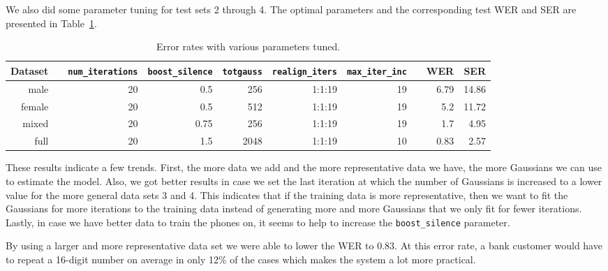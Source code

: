 \documentclass[twocolumn, 11pt]{article}
\begin{document}
We also did some parameter tuning for test sets 2 through 4. The optimal
parameters and the corresponding test WER and SER are presented in
Table~\ref{tab:wer-param}.

\begin{table}\centering
  \begin{tabular}{@{}rcrrrrrcrr@{}}\toprule%
    Dataset & \phantom{a} & \texttt{num\_iterations} & \texttt{boost\_silence}
    & \texttt{totgauss} & \texttt{realign\_iters} & \texttt{max\_iter\_inc}
    & \phantom{a} & WER & SER\\ \midrule%
    male && 20 & 0.5 & 256 & 1:1:19 & 19 && 6.79 & 14.86\\
    female && 20 & 0.5 & 512 & 1:1:19 & 19 && 5.2 & 11.72\\
    mixed && 20 & 0.75 & 256 & 1:1:19 & 19 && 1.7 & 4.95\\
    full && 20 & 1.5 & 2048 & 1:1:19 & 10 && 0.83 & 2.57\\
  \end{tabular}
  \caption{Error rates with various parameters tuned.}\label{tab:wer-param}
\end{table}

These results indicate a few trends. First, the more data we add and the more
representative data we have, the more Gaussians we can use to estimate the
model. Also, we got better results in case we set the last iteration at which
the number of Gaussians is increased to a lower value for the more general data
sets 3 and 4. This indicates that if the training data is more representative,
then we want to fit the Gaussians for more iterations to the training data
instead of generating more and more Gaussians that we only fit for fewer
iterations. Lastly, in case we have better data to train the phones on, it seems
to help to increase the \texttt{boost\_silence} parameter.

By using a larger and  more representative data set we were able to lower the
WER to 0.83. At this error rate, a bank customer would have to repeat a 16-digit
number on average in only 12\% of the cases which makes the system a lot more
practical.

\end{document}
